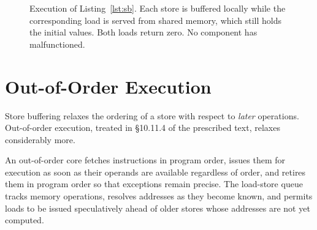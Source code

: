 \begin{figure}[H]
\centering
{}
\caption{Execution of Listing~\ref{lst:sb}. Each store is buffered locally while
the corresponding load is served from shared memory, which still holds the
initial values. Both loads return zero. No component has malfunctioned.}
\label{fig:sbtest}
\end{figure}

\section{Out-of-Order Execution}
\label{sec:ooo}

Store buffering relaxes the ordering of a store with respect to \emph{later}
operations.
Out-of-order execution, treated in \S10.11.4 of the prescribed text,
relaxes considerably more.

An out-of-order core fetches instructions in program order, issues them for
execution as soon as their operands are available regardless of order, and retires
them in program order so that exceptions remain precise.
The load-store queue
tracks memory operations, resolves addresses as they become known, and permits
loads to be issued speculatively ahead of older stores whose addresses are not yet
computed.

